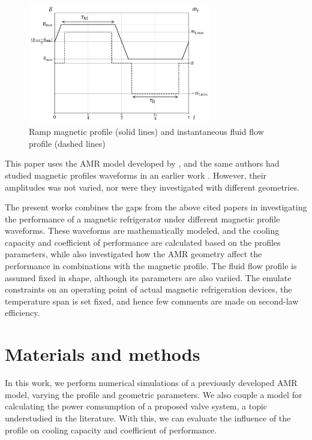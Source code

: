 \documentclass[draft]{svjour3}
\begin{document}
\begin{figure}[!ht]
  \centering
  \includegraphics[width=8cm]{profiles_rm_and_flow_instantaneous}
  \caption{Ramp magnetic profile (solid lines) and instantaneous fluid flow profile (dashed lines)}
  \label{fig:sync}
\end{figure}

This paper uses the AMR model developed by \cite{bib:trevizoli16_perfor_model}, and the same authors had studied magnetic profiles waveforms in an earlier work \cite{bib:asme-mce}. However, their amplitudes was not varied, nor were they investigated with different geometries.

The present works combines the gaps from the above cited papers in investigating the performance of a magnetic refrigerator under different magnetic profile waveforms. These waveforms are mathematically modeled, and the cooling capacity and coefficient of performance are calculated based on the profiles parameters, while also investigated how the AMR geometry affect the performance in combinations with the magnetic profile. The fluid flow profile is assumed fixed in shape, although its parameters are also variied. The emulate constraints on an operating point of actual magnetic refrigeration devices, the temperature span is set fixed, and hence few comments are made on second-law efficiency.



\section{Materials and methods}
\label{sec:materials-methods}

In this work, we perform numerical simulations of a previously developed AMR model, varying the profile and geometric parameters. We also couple a model for calculating  the power comsumption of a proposed valve system, a topic understudied in the literature. With this, we can evaluate the influence of the profile on cooling capacity and coefficient of performance.
\end{document}
